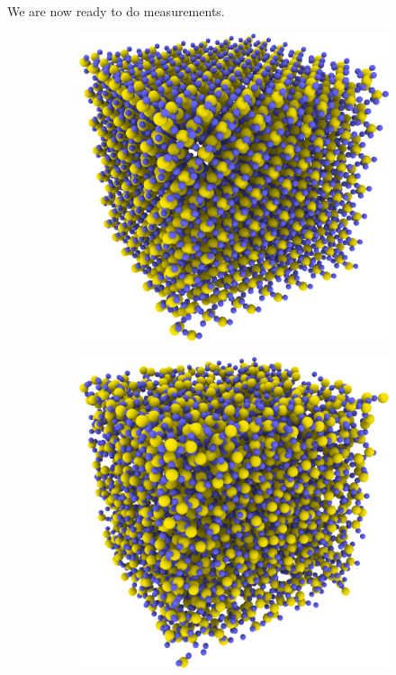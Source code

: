 We are now ready to do measurements.
%
\begin{figure}[htpb]%
    \centering%
    \begin{subfigure}[c]{0.45\textwidth}%
        \includegraphics[width=\textwidth]{images/melt_glass/perfect_crystal02_cropped}%
        \caption{}%
    \end{subfigure}%
    \hspace{0.07\textwidth}%
    \begin{subfigure}[c]{0.45\textwidth}%
        \includegraphics[width=\textwidth]{images/melt_glass/melted02_cropped}%

\end{subfigure}
\end{figure}
